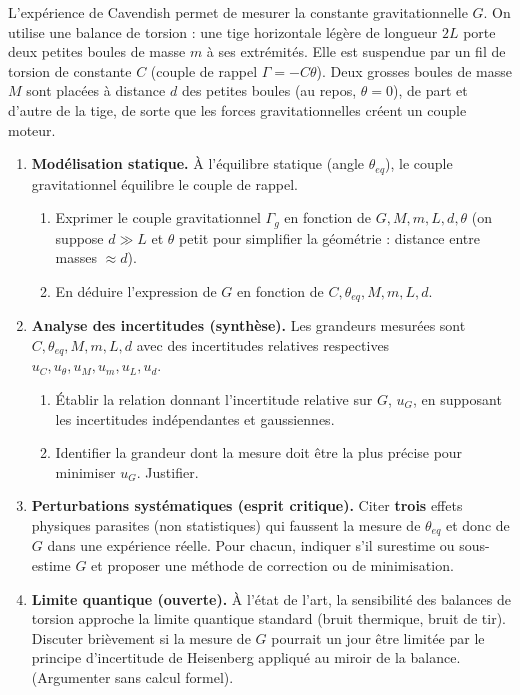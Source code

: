 \documentclass[11pt]{article}
\begin{document}
\begin{exercice}
L'expérience de Cavendish permet de mesurer la constante gravitationnelle $G$. On utilise une balance de torsion : une tige horizontale légère de longueur $2L$ porte deux petites boules de masse $m$ à ses extrémités. Elle est suspendue par un fil de torsion de constante $C$ (couple de rappel $\Gamma = -C\theta$). Deux grosses boules de masse $M$ sont placées à distance $d$ des petites boules (au repos, $\theta=0$), de part et d'autre de la tige, de sorte que les forces gravitationnelles créent un couple moteur.
\begin{enumerate}
    \item \textbf{Modélisation statique.} À l'équilibre statique (angle $\theta_{eq}$), le couple gravitationnel équilibre le couple de rappel.
    \begin{enumerate}
        \item Exprimer le couple gravitationnel $\Gamma_g$ en fonction de $G, M, m, L, d, \theta$ (on suppose $d \gg L$ et $\theta$ petit pour simplifier la géométrie : distance entre masses $\approx d$).
        \item En déduire l'expression de $G$ en fonction de $C, \theta_{eq}, M, m, L, d$.
    \end{enumerate}
    \item \textbf{Analyse des incertitudes (synthèse).} Les grandeurs mesurées sont $C, \theta_{eq}, M, m, L, d$ avec des incertitudes relatives respectives $u_C, u_\theta, u_M, u_m, u_L, u_d$.
    \begin{enumerate}
        \item Établir la relation donnant l'incertitude relative sur $G$, $u_G$, en supposant les incertitudes indépendantes et gaussiennes.
        \item Identifier la grandeur dont la mesure doit être la plus précise pour minimiser $u_G$. Justifier.
    \end{enumerate}
    \item \textbf{Perturbations systématiques (esprit critique).} Citer \textbf{trois} effets physiques parasites (non statistiques) qui faussent la mesure de $\theta_{eq}$ et donc de $G$ dans une expérience réelle. Pour chacun, indiquer s'il surestime ou sous-estime $G$ et proposer une méthode de correction ou de minimisation.
    \item \textbf{Limite quantique (ouverte).} À l'état de l'art, la sensibilité des balances de torsion approche la limite quantique standard (bruit thermique, bruit de tir). Discuter brièvement si la mesure de $G$ pourrait un jour être limitée par le principe d'incertitude de Heisenberg appliqué au miroir de la balance. (Argumenter sans calcul formel).
\end{enumerate}
\end{exercice}
\end{document}
